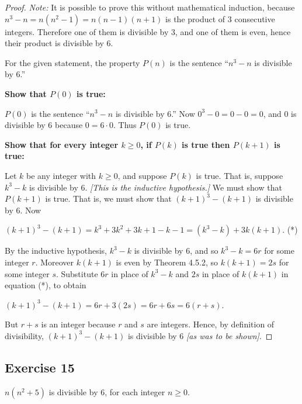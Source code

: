 \documentclass[14pt]{extarticle}
\begin{document}
\begin{proof}
    {\it Note:} It is possible to prove this without mathematical induction, because $n^3 - n = n(n^2 - 1) = n(n-1)(n+1)$ is the product of 3 consecutive integers. Therefore one of them is divisible by 3, and one of them is even, hence their product is divisible by 6.

    For the given statement, the property $P(n)$ is the sentence “$n^3 - n$ is divisible by 6.”

    {\bf Show that $P(0)$ is true:}

    $P(0)$ is the sentence “$n^3 - n$ is divisible by 6.” Now $0^3 - 0 = 0 - 0 = 0$, and 0 is divisible by 6 because $0 = 6 \cdot 0$. Thus $P(0)$ is true.

        {\bf Show that for every integer $k \geq 0$, if $P(k)$ is true then $P(k + 1)$ is true:}

    Let $k$ be any integer with $k \geq 0$, and suppose $P(k)$ is true. That is, suppose $k^3 - k$ is divisible by 6. {\it [This is the inductive hypothesis.]} We must show that $P(k + 1)$ is true. That is, we must show that $(k+1)^3 - (k+1)$ is divisible by 6. Now

    $(k + 1)^3 - (k + 1) = k^3 + 3k^2 + 3k + 1 - k - 1 = (k^3 - k) + 3k(k + 1)$. (*)

    By the inductive hypothesis, $k^3 - k$ is divisible by 6, and so $k^3 - k = 6r$ for some integer $r$. Moreover $k(k+1)$ is even by Theorem 4.5.2, so $k(k+1) = 2s$ for some integer $s$. Substitute $6r$ in place of $k^3 - k$ and $2s$ in place of $k(k+1)$ in equation (*), to obtain

    $(k + 1)^3 - (k + 1) = 6r + 3(2s) = 6r + 6s = 6(r+s)$.

    But $r+s$ is an integer because $r$ and $s$ are integers. Hence, by definition of divisibility, $(k + 1)^3 - (k + 1)$ is divisible by 6 {\it [as was to be shown]}.
\end{proof}

\subsection{Exercise 15}
$n(n^2 + 5)$ is divisible by 6, for each integer $n \geq 0$.
\end{document}
